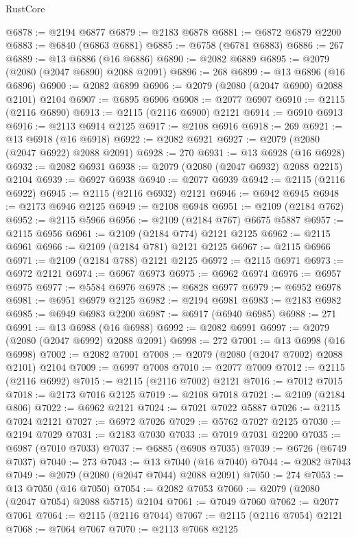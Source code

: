 \begin{lexlean}{RustCore}
\begin{coremodule}
@6878 := @2194 @6877
@6879 := @2183 @6878
@6881 := @6872 @6879 @2200
@6883 := @6840 (@6863 @6881)
@6885 := @6758 (@6781 @6883)
@6886 := 267
@6889 := @13 @6886 (@16 @6886)
@6890 := @2082 @6889
@6895 := @2079 (@2080 (@2047 @6890) @2088 @2091)
@6896 := 268
@6899 := @13 @6896 (@16 @6896)
@6900 := @2082 @6899
@6906 := @2079 (@2080 (@2047 @6900) @2088 @2101) @2104
@6907 := @6895 @6906
@6908 := @2077 @6907
@6910 := @2115 (@2116 @6890)
@6913 := @2115 (@2116 @6900) @2121
@6914 := @6910 @6913
@6916 := @2113 @6914 @2125
@6917 := @2108 @6916
@6918 := 269
@6921 := @13 @6918 (@16 @6918)
@6922 := @2082 @6921
@6927 := @2079 (@2080 (@2047 @6922) @2088 @2091)
@6928 := 270
@6931 := @13 @6928 (@16 @6928)
@6932 := @2082 @6931
@6938 := @2079 (@2080 (@2047 @6932) @2088 @2215) @2104
@6939 := @6927 @6938
@6940 := @2077 @6939
@6942 := @2115 (@2116 @6922)
@6945 := @2115 (@2116 @6932) @2121
@6946 := @6942 @6945
@6948 := @2173 @6946 @2125
@6949 := @2108 @6948
@6951 := @2109 (@2184 @762)
@6952 := @2115 @5966
@6956 := @2109 (@2184 @767) @6675 @5887
@6957 := @2115 @6956
@6961 := @2109 (@2184 @774) @2121 @2125
@6962 := @2115 @6961
@6966 := @2109 (@2184 @781) @2121 @2125
@6967 := @2115 @6966
@6971 := @2109 (@2184 @788) @2121 @2125
@6972 := @2115 @6971
@6973 := @6972 @2121
@6974 := @6967 @6973
@6975 := @6962 @6974
@6976 := @6957 @6975
@6977 := @5584 @6976
@6978 := @6828 @6977
@6979 := @6952 @6978
@6981 := @6951 @6979 @2125
@6982 := @2194 @6981
@6983 := @2183 @6982
@6985 := @6949 @6983 @2200
@6987 := @6917 (@6940 @6985)
@6988 := 271
@6991 := @13 @6988 (@16 @6988)
@6992 := @2082 @6991
@6997 := @2079 (@2080 (@2047 @6992) @2088 @2091)
@6998 := 272
@7001 := @13 @6998 (@16 @6998)
@7002 := @2082 @7001
@7008 := @2079 (@2080 (@2047 @7002) @2088 @2101) @2104
@7009 := @6997 @7008
@7010 := @2077 @7009
@7012 := @2115 (@2116 @6992)
@7015 := @2115 (@2116 @7002) @2121
@7016 := @7012 @7015
@7018 := @2173 @7016 @2125
@7019 := @2108 @7018
@7021 := @2109 (@2184 @806)
@7022 := @6962 @2121
@7024 := @7021 @7022 @5887
@7026 := @2115 @7024 @2121
@7027 := @6972 @7026
@7029 := @5762 @7027 @2125
@7030 := @2194 @7029
@7031 := @2183 @7030
@7033 := @7019 @7031 @2200
@7035 := @6987 (@7010 @7033)
@7037 := @6885 (@6908 @7035)
@7039 := @6726 (@6749 @7037)
@7040 := 273
@7043 := @13 @7040 (@16 @7040)
@7044 := @2082 @7043
@7049 := @2079 (@2080 (@2047 @7044) @2088 @2091)
@7050 := 274
@7053 := @13 @7050 (@16 @7050)
@7054 := @2082 @7053
@7060 := @2079 (@2080 (@2047 @7054) @2088 @5715) @2104
@7061 := @7049 @7060
@7062 := @2077 @7061
@7064 := @2115 (@2116 @7044)
@7067 := @2115 (@2116 @7054) @2121
@7068 := @7064 @7067
@7070 := @2113 @7068 @2125

\end{coremodule}
\end{lexlean}
